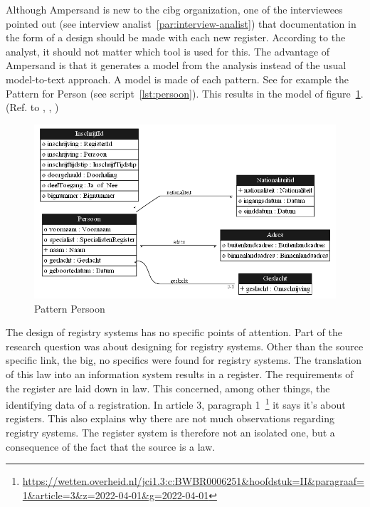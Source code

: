 Although Ampersand is new to the \acrshort{cibg} organization, one of the interviewees pointed out (see interview analist~\ref{par:interview-analist}) that documentation in the form of a design should be made with each new register.
According to the analyst, it should not matter which tool is used for this.
The advantage of Ampersand is that it generates a model from the analysis instead of the usual model-to-text approach.
A model is made of each pattern.
See for example the Pattern for \mbox{Person} (see script~\ref{lst:persoon}).
This results in the model of figure~\ref{fig:pattern-persoon}.
(Ref. to , , )
\begin{figure}[H]
    \centering
        \includegraphics[width=1\textwidth]
            {../images/CDPatternPersoon.png}
        \caption{Pattern Persoon}
    \label{fig:pattern-persoon}
\end{figure}


The design of registry systems has no specific points of attention.
Part of the research question was about designing for registry systems.
Other than the source specific link, the \acrshort{big}, no specifics were found for registry systems.
The translation of this law into an information system results in a register.
The requirements of the register are laid down in law.
This concerned, among other things, the identifying data of a registration.
In article 3, paragraph 1~\footnote{\url{https://wetten.overheid.nl/jci1.3:c:BWBR0006251&hoofdstuk=II&paragraaf=1&article=3&z=2022-04-01&g=2022-04-01}} it says it's about registers.
This also explains why there are not much observations regarding registry systems.
The register system is therefore not an isolated one, but a consequence of the fact that the source is a law.

